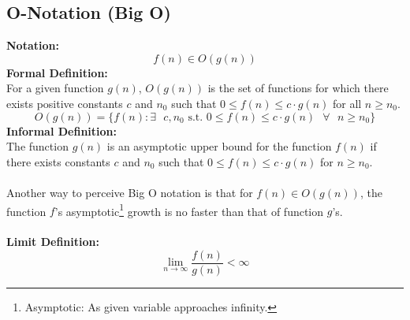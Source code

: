 \subsection{O-Notation (Big O)}
\textbf{Notation:} 
$$f(n) \in O(g(n))$$
\textbf{Formal Definition:}\\
For a given function $g(n)$, $O(g(n))$ is the set of functions for which there exists positive constants $c$ and $n_0$ such that $0 \leq f(n) \leq c \cdot g(n)$ for all $n \geq n_0$.
$$
O(g(n)) = \{ f(n) : \exists \text{ } c, n_0 \text{ s.t. } 0 \leq f(n) \leq c \cdot g(n) \text{ } \forall \text{ } n \geq n_0 \}
$$
\textbf{Informal Definition:}\\
The function $g(n)$ is an asymptotic upper bound for the function $f(n)$ if there exists constants $c$ and $n_0$ such that $0 \leq f(n) \leq c \cdot g(n)$ for $n \geq n_0$.\\\\
Another way to perceive Big O notation is that for $f(n) \in O(g(n))$, the function $f$'s asymptotic\footnote{Asymptotic: As given variable approaches infinity.} growth is no faster than that of function $g$'s.\\\\
\textbf{Limit Definition:}
$$ 
\lim\limits_{n \to \infty} \frac{f(n)}{g(n)} < \infty
$$